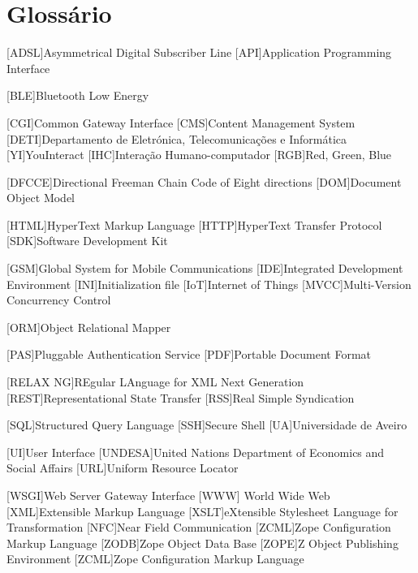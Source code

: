 \chapter*{Glossário}
	\begin{acronym}[RELAX NG]
		
		{Asymmetrical Digital Subscriber Line}
		[API]{Application Programming Interface}
		
		[BLE]{Bluetooth Low Energy}
		
		[CGI]{Common Gateway Interface}
		[CMS]{Content Management System}
		{Departamento de Eletrónica, Telecomunicações e Informática  }
		[YI]{YouInteract}		
		[IHC]{Interação Humano-computador}	
        [RGB]{Red, Green, Blue}
        
		[DFCCE]{Directional Freeman Chain Code of Eight directions}
		[DOM]{Document Object Model}
		
		{HyperText Markup Language}
		{HyperText Transfer Protocol}		
		[SDK]{Software Development Kit}
        
        
        
        [GSM]{Global System for Mobile Communications}
		[IDE]{Integrated Development Environment}
		[INI]{Initialization file}	
		[IoT]{Internet of Things}			
		{Multi-Version Concurrency Control}		

		[ORM]{Object Relational Mapper}
		
		[PAS]{Pluggable Authentication Service}
		[PDF]{Portable Document Format}
		
		[RELAX NG]{REgular LAnguage for XML Next Generation}
		{Representational State Transfer}
		[RSS]{Real Simple Syndication}
		
		[SQL]{Structured Query Language}		
		[SSH]{Secure Shell}
		[UA]{Universidade de Aveiro}
        
		[UI]{User Interface}
		[UNDESA]{United Nations Department of Economics and Social Affairs}
		[URL]{Uniform Resource Locator}
		
		{Web Server Gateway Interface}
		[WWW]{ World Wide Web}
		[XML]{Extensible Markup Language}
		{eXtensible Stylesheet Language for Transformation}
		[NFC]{Near Field Communication}
		{Zope Configuration Markup Language}
		{Zope Object Data Base}
		{Z Object Publishing Environment}
		{Zope Configuration Markup Language}
	\end{acronym}